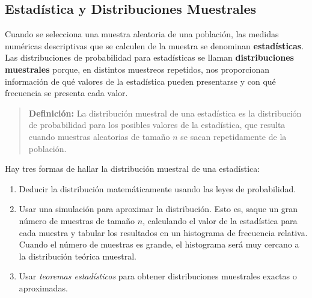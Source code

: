 \documentclass[]{article}
\begin{document}
\subsection{Estadística y Distribuciones Muestrales}
Cuando se selecciona una muestra aleatoria de una población, las medidas numéricas descriptivas que se calculen de la muestra se denominan \textbf{estadísticas}. Las distribuciones de probabilidad para estadísticas se llaman \textbf{distribuciones muestrales} porque, en distintos muestreos repetidos, nos proporcionan información de qué valores de la estadística pueden presentarse y con qué frecuencia se presenta cada valor.
\begin{quote}
	\textbf{Definición:} La distribución muestral de una estadística es la distribución de probabilidad para los posibles valores de la estadística, que resulta cuando muestras aleatorias de tamaño $n$ se sacan repetidamente de la población.
\end{quote}
Hay tres formas de hallar la distribución muestral de una estadística:
\begin{enumerate}
	\item Deducir la distribución matemáticamente usando las leyes de probabilidad.
	\item Usar una simulación para aproximar la distribución. Esto es, saque un gran número de muestras de tamaño $n$, calculando el valor de la estadística para cada muestra y tabular los resultados en un histograma de frecuencia relativa. Cuando el número de muestras es grande, el histograma será muy cercano a la distribución teórica muestral.
	\item Usar \textit{teoremas estadísticos} para obtener distribuciones muestrales exactas o aproximadas.
\end{enumerate}
\end{document}
